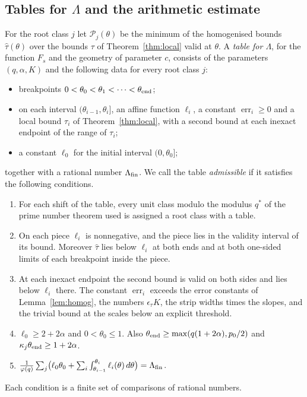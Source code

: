 \documentclass[11pt]{amsart}
\theoremstyle{definition}
\theoremstyle{remark}
\numberwithin{equation}{section}
\newcommand{\err}{\operatorname{err}}
\begin{document}
\subsection{Tables for $\Lambda$ and the arithmetic estimate}\label{ssec:checker}
For the root class $j$ let $\mathcal P_j(\theta)$ be the minimum of the homogenised bounds $\hat\tau(\theta)$ over the
bounds $\tau$ of Theorem~\ref{thm:local} valid at $\theta$. A \emph{table for $\Lambda$}, for the function $F_s$ and
the geometry of parameter $c$, consists of the parameters $(q,\alpha,K)$ and the following data for every root class $j$:
\begin{itemize}
\item breakpoints $0<\theta_0<\theta_1<\dots<\theta_{\rm end}$;
\item on each interval $(\theta_{i-1},\theta_i]$, an affine function $\ell_i$, a constant $\err_i\ge0$ and a local bound
 $\tau_i$ of Theorem~\ref{thm:local}, with a second bound at each inexact endpoint of the range of $\tau_i$;
\item a constant $\ell_0$ for the initial interval $(0,\theta_0]$;
\end{itemize}
together with a rational number $\Lambda_{\rm fin}$. We call the table \emph{admissible} if it satisfies the following
conditions.
\begin{enumerate}[label=(C\arabic*),leftmargin=*]
\item For each shift of the table, every unit class modulo the modulus $q^*$ of the prime number theorem used is assigned
 a root class with a table.
\item On each piece $\ell_i$ is nonnegative, and the piece lies in the validity interval of its bound. Moreover
 $\hat\tau$ lies below $\ell_i$ at both ends and at both one-sided limits of each breakpoint inside the piece.
\item At each inexact endpoint the second bound is valid on both sides and lies below $\ell_i$ there. The constant
 $\err_i$ exceeds the error constants of Lemma~\ref{lem:homog}, the numbers $\epsilon_\tau K$, the strip widths times the slopes,
 and the trivial bound at the scales below an explicit threshold.
\item $\ell_0\ge2+2\alpha$ and $0<\theta_0\le1$. Also $\theta_{\rm end}\ge\max(q(1+2\alpha),p_0/2)$ and
 $\kappa_j\theta_{\rm end}\ge1+2\alpha$.
\item $\frac1{\varphi(q)}\sum_j\bigl(\ell_0\theta_0+\sum_i\int_{\theta_{i-1}}^{\theta_i}\ell_i(\theta)\,d\theta\bigr)
 =\Lambda_{\rm fin}$.
\end{enumerate}
Each condition is a finite set of comparisons of rational numbers.
\end{document}
